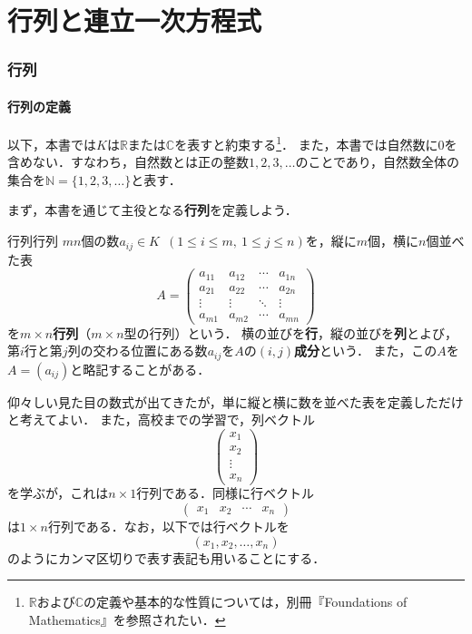 \part{行列と連立一次方程式}

\begin{abstract}
  この章では，線型代数の出発点となる\textbf{行列}を定義する．
  まず行列を単なる「数の表」として定義し，演算を定める．それと同時に，行列の諸性質を見ていくこととする．
\end{abstract}

\section{行列}

\subsection{行列の定義}

以下，本書では$K$は$\mathbb{R}$または$\mathbb{C}$を表すと約束する\footnote{$\mathbb{R}$および$\mathbb{C}$の定義や基本的な性質については，別冊『Foundations of Mathematics』を参照されたい．}．
また，本書では自然数に$0$を含めない．すなわち，自然数とは正の整数$1, 2, 3, \dots$のことであり，自然数全体の集合を$\mathbb{N} = \{1, 2, 3, \dots\}$と表す．

まず，本書を通じて主役となる\textbf{行列}を定義しよう．

\begin{definition}{行列}{行列}
  $mn$個の数$a_{ij} \in K$~$(1 \le i \le m,~1 \le j \le n)$を，縦に$m$個，横に$n$個並べた表
  \[
    A =
    \begin{pmatrix}
      a_{11} & a_{12} & \cdots & a_{1n} \\
      a_{21} & a_{22} & \cdots & a_{2n} \\
      \vdots & \vdots & \ddots & \vdots \\
      a_{m1} & a_{m2} & \cdots & a_{mn}
    \end{pmatrix}
  \]
  を\textbf{$m \times n$行列}（$m \times n$型の行列）という．
  横の並びを\textbf{行}，縦の並びを\textbf{列}とよび，第$i$行と第$j$列の交わる位置にある数$a_{ij}$を$A$の\textbf{$(i, j)$成分}という．
  また，この$A$を$A = (a_{ij})$と略記することがある．
\end{definition}

仰々しい見た目の数式が出てきたが，単に縦と横に数を並べた表を定義しただけと考えてよい．
また，高校までの学習で，列ベクトル
\[
  \begin{pmatrix} x_1 \\ x_2 \\ \vdots \\ x_n \end{pmatrix}
\]
を学ぶが，これは$n \times 1$行列である．同様に行ベクトル
\[
  \begin{pmatrix} x_1 & x_2 & \cdots & x_n \end{pmatrix}
\]
は$1 \times n$行列である．なお，以下では行ベクトルを
\[
  (x_1, x_2, \dots, x_n)
\]
のようにカンマ区切りで表す表記も用いることにする．

